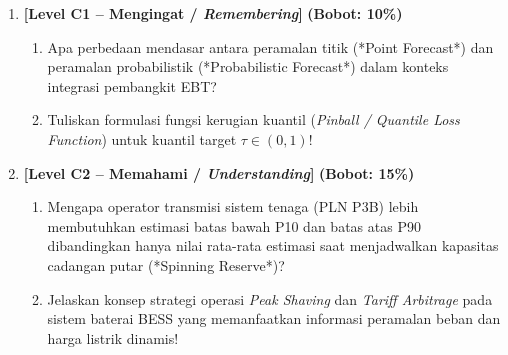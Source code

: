 \documentclass[11pt,a4paper]{article}
\begin{document}
\begin{enumerate}[leftmargin=1.5em, label=\textbf{Soal \arabic*.}]

    \item \textbf{[Level C1 -- Mengingat / \textit{Remembering}]} \hfill \textbf{(Bobot: 10\%)}
    \begin{enumerate}[label=\alph*.]
        \item Apa perbedaan mendasar antara peramalan titik (*Point Forecast*) dan peramalan probabilistik (*Probabilistic Forecast*) dalam konteks integrasi pembangkit EBT?
        \item Tuliskan formulasi fungsi kerugian kuantil (\textit{Pinball / Quantile Loss Function}) untuk kuantil target $\tau \in (0, 1)$!
    \end{enumerate}

    \vspace{0.3cm}

    \item \textbf{[Level C2 -- Memahami / \textit{Understanding}]} \hfill \textbf{(Bobot: 15\%)}
    \begin{enumerate}[label=\alph*.]
        \item Mengapa operator transmisi sistem tenaga (PLN P3B) lebih membutuhkan estimasi batas bawah P10 dan batas atas P90 dibandingkan hanya nilai rata-rata estimasi saat menjadwalkan kapasitas cadangan putar (*Spinning Reserve*)?
        \item Jelaskan konsep strategi operasi \textit{Peak Shaving} dan \textit{Tariff Arbitrage} pada sistem baterai BESS yang memanfaatkan informasi peramalan beban dan harga listrik dinamis!
    \end{enumerate}

    \vspace{0.3cm}


\end{enumerate}
\end{document}
